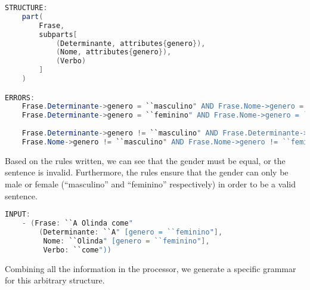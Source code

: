 \begin{center}
\begin{minipage}{15cm}
\begin{lstlisting}[language=java, basicstyle=\tiny, label={lst:arbitrary_structure}, caption=Example of an arbitrary sentence structure]
STRUCTURE:
    part(
        Frase,
        subparts[
            (Determinante, attributes{genero}),
            (Nome, attributes{genero}),
            (Verbo)
        ]
    )

ERRORS:
    Frase.Determinante->genero = ``masculino" AND Frase.Nome->genero = ``feminino";
    Frase.Determinante->genero = ``feminino" AND Frase.Nome->genero = ``masculino";
    
    Frase.Determinante->genero != ``masculino" AND Frase.Determinante->genero != ``feminino";
    Frase.Nome->genero != ``masculino" AND Frase.Nome->genero != ``feminino";
\end{lstlisting}
\end{minipage}
\end{center}

Based on the rules written, we can see that the gender must be equal, or the sentence is invalid. Furthermore, the rules ensure that the gender can only be male or female (``masculino'' and ``feminino'' respectively) in order
to be a valid sentence.

\begin{center}
\begin{minipage}{14cm}
\begin{lstlisting}[language=java, basicstyle=\tiny, label={lst:arbitrary_structure_input}, caption=Example of an arbitrary sentence input]
INPUT:
    - (Frase: ``A Olinda come"
        (Determinante: ``A" [genero = ``feminino"],
         Nome: ``Olinda" [genero = ``feminino"],
         Verbo: ``come"))
\end{lstlisting}
\end{minipage}
\end{center}

Combining all the information in the processor, we generate a specific grammar for this arbitrary structure.

